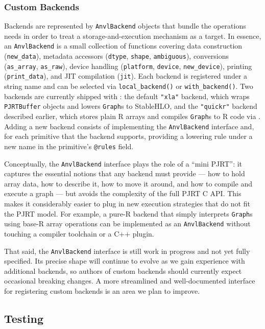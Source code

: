 \subsubsection{Custom Backends}\label{custom-backends}

Backends are represented by \texttt{AnvlBackend} objects that bundle the operations  needs in order to treat a storage-and-execution mechanism as a target.
In essence, an \texttt{AnvlBackend} is a small collection of functions covering data construction (\texttt{new\_data}), metadata accessors (\texttt{dtype}, \texttt{shape}, \texttt{ambiguous}), conversions (\texttt{as\_array}, \texttt{as\_raw}), device handling (\texttt{platform}, \texttt{device}, \texttt{new\_device}), printing (\texttt{print\_data}), and JIT compilation (\texttt{jit}).
Each backend is registered under a string name and can be selected via \texttt{local\_backend()} or \texttt{with\_backend()}.
Two backends are currently shipped with : the default \texttt{"xla"} backend, which wraps \texttt{PJRTBuffer} objects and lowers \texttt{Graph}s to StableHLO, and the \texttt{"quickr"} backend described earlier, which stores plain R arrays and compiles \texttt{Graph}s to R code via .
Adding a new backend consists of implementing the \texttt{AnvlBackend} interface and, for each primitive that the backend supports, providing a lowering rule under a new name in the primitive's \texttt{@rules} field.

Conceptually, the \texttt{AnvlBackend} interface plays the role of a ``mini PJRT'': it captures the essential notions that any backend must provide --- how to hold array data, how to describe it, how to move it around, and how to compile and execute a graph --- but avoids the complexity of the full PJRT C API.
This makes it considerably easier to plug in new execution strategies that do not fit the PJRT model.
For example, a pure-R backend that simply interprets \texttt{Graph}s using base-R array operations can be implemented as an \texttt{AnvlBackend} without touching a compiler toolchain or a C++ plugin.

That said, the \texttt{AnvlBackend} interface is still work in progress and not yet fully specified.
Its precise shape will continue to evolve as we gain experience with additional backends, so authors of custom backends should currently expect occasional breaking changes.
A more streamlined and well-documented interface for registering custom backends is an area we plan to improve.

\subsection{Testing}\label{testing}

